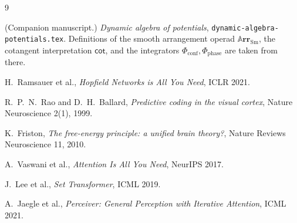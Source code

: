 \documentclass[11pt]{article}
\theoremstyle{plain}
\theoremstyle{definition}
\theoremstyle{remark}
\newcommand{\Cat}[1]{\mathbf{#1}}
\newcommand{\Sm}{\mathrm{Sm}}
\newcommand{\arr}{\mathbb{A}\Cat{rr}}    %
\newcommand{\sarr}{\arr_{\Sm}}           %
\renewcommand{\cot}{\mathsf{cot}}        %
\newcommand{\conf}{\mathrm{conf}}
\newcommand{\phase}{\mathrm{phase}}
\newcommand{\Phiconf}{\Phi_{\conf}}
\newcommand{\Phiphase}{\Phi_{\phase}}
\begin{document}
\begin{thebibliography}{9}

 (Companion manuscript.) \emph{Dynamic algebra of potentials},
\texttt{dynamic-algebra-potentials.tex}. Definitions of the smooth
arrangement operad $\sarr$, the cotangent interpretation $\cot$, and the
integrators $\Phiconf,\Phiphase$ are taken from there.

 H.~Ramsauer et al.,
\emph{Hopfield Networks is All You Need}, ICLR 2021.

 R.~P.~N.~Rao and D.~H.~Ballard,
\emph{Predictive coding in the visual cortex}, Nature Neuroscience 2(1), 1999.

 K.~Friston,
\emph{The free-energy principle: a unified brain theory?},
Nature Reviews Neuroscience 11, 2010.

 A.~Vaswani et al.,
\emph{Attention Is All You Need}, NeurIPS 2017.

 J.~Lee et al.,
\emph{Set Transformer}, ICML 2019.

 A.~Jaegle et al.,
\emph{Perceiver: General Perception with Iterative Attention}, ICML 2021.

\end{thebibliography}
\end{document}

